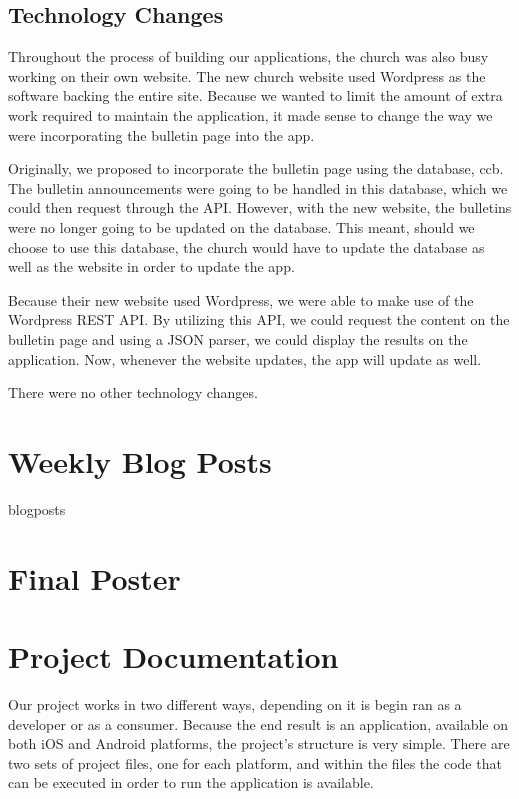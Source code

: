 \documentclass[letterpaper,10pt,draftclsnofoot,onecolumn,titlepage]{IEEEtran}
\begin{document}
	\subsection{Technology Changes}
	Throughout the process of building our applications, the church was also busy working on their own website. 
	The new church website used Wordpress as the software backing the entire site. 
	Because we wanted to limit the amount of extra work required to maintain the application, it made sense to change the way we were incorporating the bulletin page into the app. 
	
	Originally, we proposed to incorporate the bulletin page using the database, \gls{ccb}. 
	The bulletin announcements were going to be handled in this database, which we could then request through the API. 
	However, with the new website, the bulletins were no longer going to be updated on the database. 
	This meant, should we choose to use this database, the church would have to update the database as well as the website in order to update the app. 
	
	Because their new website used Wordpress, we were able to make use of the Wordpress REST API. 
	By utilizing this API, we could request the content on the bulletin page and using a JSON parser, we could display the results on the application. 
	Now, whenever the website updates, the app will update as well. 
	
	There were no other technology changes. 
	
\section{Weekly Blog Posts}

	{blogposts}
	
\section{Final Poster}



\section{Project Documentation}

Our project works in two different ways, depending on it is begin ran as a developer or as a consumer. 
Because the end result is an application, available on both iOS and Android platforms, the project's structure is very simple. 
There are two sets of project files, one for each platform, and within the files the code that can be executed in order to run the application is available. 
\end{document}
